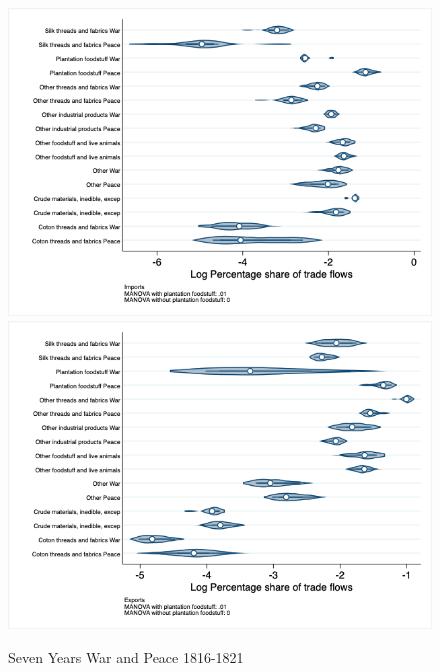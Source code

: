 \documentclass[12pt,a4paper,notitlepage,english]{article}
\begin{document}
\begin{appendix}
\begin{figure}[h!]
\centering
\caption{Seven Years War and Peace 1816-1821}
\label{seven_peace1764_1777_nat_distr_aggr}
\includegraphics[scale=.4]{seven_peace1764_1777_nat_distr_Iaggr}
\includegraphics[scale=.4]{seven_peace1764_1777_nat_distr_Xaggr}
\end{figure}


\end{appendix}
\end{document}
